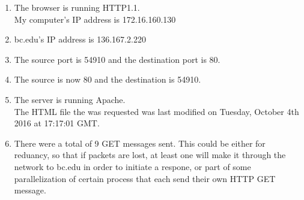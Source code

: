 \documentclass[12pt]{article}
\begin{document}
\begin{enumerate}[label=\textbf{Question \arabic*) }]
	\item The browser is running HTTP1.1.\\ My computer's IP address is 172.16.160.130\\
	\item bc.edu's  IP address is 136.167.2.220\\
	\item The source port is 54910 and the destination port is 80.\\
	\item The source is now 80 and the destination is 54910. \\
	\item The server is running Apache.\\	The HTML file the was requested was last modified on Tuesday, October 4th 	2016 at 17:17:01 GMT.\\
	\item There were a total of 9 GET messages sent. This could be either for reduancy, so that if packets are lost, at least one will make it through the network to bc.edu in order to
 initiate a respone, or part of some parallelization of certain process that each send their own HTTP GET message.
\end{enumerate}
\end{document}
